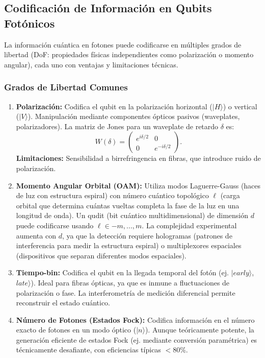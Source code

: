 \documentclass{article}
\begin{document}
\subsection*{Codificación de Información en Qubits Fotónicos}

La información cuántica en fotones puede codificarse en múltiples grados de libertad (DoF: propiedades físicas independientes como polarización o momento angular), cada uno con ventajas y limitaciones técnicas.

\subsubsection*{Grados de Libertad Comunes}

\begin{enumerate}
    \item \textbf{Polarización:}  
    Codifica el qubit en la polarización horizontal ($|H\rangle$) o vertical ($|V\rangle$). Manipulación mediante componentes ópticos pasivos (waveplates, polarizadores). La matriz de Jones para un waveplate de retardo $\delta$ es:
    \[
    W(\delta) = \begin{pmatrix}
    e^{i\delta/2} & 0 \\
    0 & e^{-i\delta/2}
    \end{pmatrix}.
    \]
    \textbf{Limitaciones:} Sensibilidad a birrefringencia en fibras, que introduce ruido de polarización.

    \item \textbf{Momento Angular Orbital (OAM):}
Utiliza modos Laguerre-Gauss (haces de luz con estructura espiral) con número cuántico topológico $\ell$ (carga orbital que determina cuántas vueltas completa la fase de la luz en una longitud de onda). Un qudit (bit cuántico multidimensional) de dimensión $d$ puede codificarse usando $\ell \in {-m, ..., m}$. La complejidad experimental aumenta con $d$, ya que la detección requiere hologramas (patrones de interferencia para medir la estructura espiral) o multiplexores espaciales (dispositivos que separan diferentes modos espaciales).

    \item \textbf{Tiempo-bin:}  
    Codifica el qubit en la llegada temporal del fotón (ej. $|early\rangle$, $late\rangle$). Ideal para fibras ópticas, ya que es inmune a fluctuaciones de polarización o fase. La interferometría de medición diferencial permite reconstruir el estado cuántico.

    \item \textbf{Número de Fotones (Estados Fock):}  
    Codifica información en el número exacto de fotones en un modo óptico ($|n\rangle$). Aunque teóricamente potente, la generación eficiente de estados Fock (ej. mediante conversión paramétrica) es técnicamente desafiante, con eficiencias típicas $<$80\%.
\end{enumerate}
\end{document}
